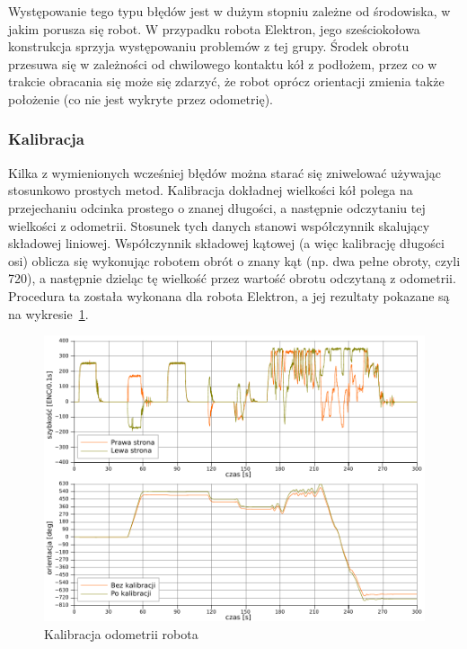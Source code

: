 Występowanie tego typu błędów jest w dużym stopniu zależne od środowiska, w
jakim porusza się robot. W przypadku robota Elektron, jego sześciokołowa
konstrukcja sprzyja występowaniu problemów z tej grupy. Środek obrotu przesuwa
się w zależności od chwilowego kontaktu kół z podłożem, przez co w trakcie
obracania się może się zdarzyć, że robot oprócz orientacji zmienia także
położenie (co nie jest wykryte przez odometrię).

\subsubsection{Kalibracja}

Kilka z wymienionych wcześniej błędów można starać się zniwelować używając
stosunkowo prostych metod. Kalibracja dokładnej wielkości kół polega na
przejechaniu odcinka prostego o znanej długości, a następnie odczytaniu tej
wielkości z odometrii. Stosunek tych danych stanowi współczynnik skalujący
składowej liniowej. Współczynnik składowej kątowej (a więc kalibrację długości
osi) oblicza się wykonując robotem obrót o znany kąt (np. dwa pełne obroty,
czyli 720\textdegree), a następnie dzieląc tę wielkość przez wartość obrotu
odczytaną z odometrii. Procedura ta została wykonana dla robota Elektron, a jej
rezultaty pokazane są na wykresie~\ref{fig:odom_calib}.

\begin{figure}[ht!]
\centering
\includegraphics[width=\textwidth]{../../Common/pomiary/odom_calib}
\caption{Kalibracja odometrii robota}
\label{fig:odom_calib}
\end{figure}

